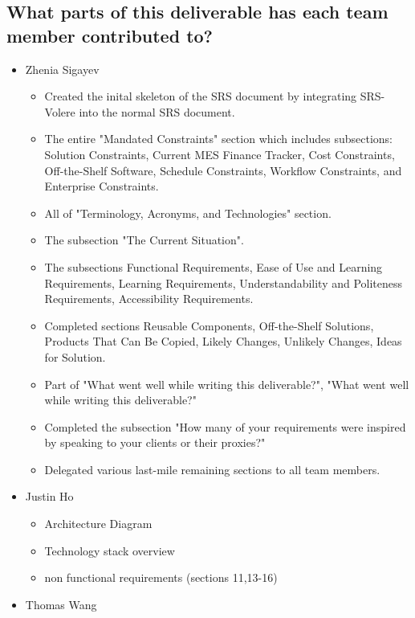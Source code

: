 \documentclass[12pt]{article}
\begin{document}
\begin{enumerate}
  \subsection{What parts of this deliverable has each team member contributed to?}
  \begin{itemize}
    \item Zhenia Sigayev
      \begin{itemize}[label=$\circ$]
        \item Created the inital skeleton of the SRS document by integrating SRS-Volere into the normal SRS document.
        \item The entire "Mandated Constraints" section which includes subsections: Solution Constraints, Current MES Finance Tracker, Cost Constraints, Off-the-Shelf Software, Schedule Constraints, Workflow Constraints, and Enterprise Constraints.
        \item All of "Terminology, Acronyms, and Technologies" section.
        \item The subsection "The Current Situation".
        \item The subsections Functional Requirements, Ease of Use and Learning Requirements, Learning Requirements, Understandability and Politeness Requirements, Accessibility Requirements.
        \item Completed sections Reusable Components, Off-the-Shelf Solutions, Products That Can Be Copied, Likely Changes, Unlikely Changes, Ideas for Solution.
        \item Part of "What went well while writing this deliverable?", "What went well while writing this deliverable?"
        \item Completed the subsection "How many of your requirements were inspired by speaking to your clients or their proxies?"
        \item Delegated various last-mile remaining sections to all team members.
      \end{itemize}
    \item Justin Ho
      \begin{itemize}[label=$\circ$]
        \item Architecture Diagram
        \item Technology stack overview
        \item non functional requirements (sections 11,13-16)
      \end{itemize}
    \item Thomas Wang
      \begin{itemize}[label=$\circ$]

\end{itemize}
\end{itemize}
\end{enumerate}
\end{document}
